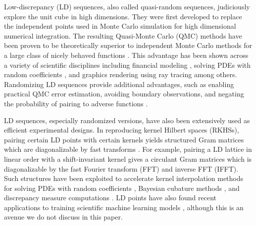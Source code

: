 \documentclass[acmsmall]{acmart}
\begin{document}
Low-discrepancy (LD) sequences, also called quasi-random sequences, judiciously explore the unit cube in high dimensions. They were first developed to replace the independent points used in Monte Carlo simulation for high dimensional numerical integration. The resulting Quasi-Monte Carlo (QMC) methods have been proven to be theoretically superior to independent Monte Carlo methods for a large class of nicely behaved functions \citep{niederreiter.qmc_book,dick.digital_nets_sequences_book,kroese.handbook_mc_methods,dick2022lattice,lemieux2009monte,sloan1994lattice,dick.high_dim_integration_qmc_way}. This advantage has been shown across a variety of scientific disciplines including financial modeling \citep{joy1996quasi,lai1998applications,l2004quasi,l2009quasi,xu2015high,giles.mlqmc_path_simulation}, solving PDEs with random coefficients \citep{graham2011quasi,kuo2012quasi,kuo2015multi,graham2015quasi,MagicPointShop.software,robbe.multi_index_qmc}, and graphics rendering using ray tracing \citep{jensen2003monte,raab2006unbiased,waechter2011quasi} among others. Randomizing LD sequences provide additional advantages, such as enabling practical QMC error estimation, avoiding boundary observations, and negating the probability of pairing to adverse functions \citep{owen1995randomly,l2016randomized,l2023confidence,owen.variance_alternative_scrambles_digital_net,MATOUSEK1998527,tezuka2002randomization}.

LD sequences, especially randomized versions, have also been extensively used as efficient experimental designs. In reproducing kernel Hilbert spaces (RKHSs), pairing certain LD points with certain kernels yields structured Gram matrices which are diagonalizable by fast transforms \citep{zeng.spline_lattice_digital_net,zeng.spline_lattice_error_analysis}. For example, pairing a LD lattice in linear order with a shift-invariant kernel gives a circulant Gram matrices which is diagonalizable by the fast Fourier transform (FFT) and inverse FFT (IFFT). Such structures have been exploited to accelerate kernel interpolation methods for solving PDEs with random coefficients \citep{kaarnioja.kernel_interpolants_lattice_rkhs,kaarnioja.kernel_interpolants_lattice_rkhs_serendipitous,sorokin.gp4darcy}, Bayesian cubature methods \citep{rathinavel.bayesian_QMC_lattice,rathinavel.bayesian_QMC_sobol,rathinavel.bayesian_QMC_thesis}, and discrepancy measure computations \citep{hickernell.generalized_discrepancy_quadrature_error_bound,hickernell1998lattice}. LD points have also found recent applications to training scientific machine learning models \citep{longo2021higher,chen2021quasi,keller2025regularity}, although this is an avenue we do not discuss in this paper.
\end{document}
